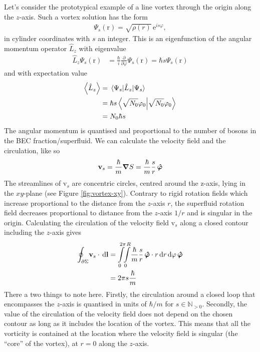 \documentclass[11pt,a4paper,twoside]{article}
\renewcommand{\vec}[1]{\bm{\mathrm{#1}}}
\newcommand{\unit}[1]{\,\mathrm{#1}}
\begin{document}
			Let's consider the prototypical example of a line vortex through the origin along the $z$-axis. Such a vortex solution has the form
			\begin{align}
				\Psi_s(\vec{r}) = \sqrt{\rho(r)}\unit{e}^{is\varphi},
			\end{align}
			in cylinder coordinates with $s$ an integer. This is an eigenfunction of the angular momentum operator $\hat{L}_z$ with eigenvalue
			\begin{align}
				\hat{L}_z \Psi_s(\vec{r}) &= \frac{\hbar}{i}\frac{\partial}{\partial\varphi}\Psi_s(\vec{r}) = \hbar s\Psi_s(\vec{r})
			\end{align}
			and with expectation value
			\begin{align}
				\expval{\hat{L}_z} &= \expval{\hat{L}_z}{\Psi_s} \\
					&= \hbar s \braket{\sqrt{N_0}\varphi_0} \\
					&= N_0\hbar s
			\end{align}
			The angular momentum is quantised and proportional to the number of bosons in the BEC fraction/superfluid. We can calculate the velocity field and the circulation, like so
			\begin{align}
				\vec{v}_s = \frac{\hbar}{m}\grad{S} = \frac{\hbar}{m}\frac{s}{r}\,\vu*{\varphi}
			\end{align}
			The streamlines of $\vec{v}_s$ are concentric circles, centred around the z-axis, lying in the $xy$-plane (see Figure \ref{fig:vortex-xy}). Contrary to rigid rotation fields which increase proportional to the distance from the $z$-axis $r$, the superfluid rotation field decreases proportional to distance from the $z$-axis $1/r$ and is singular in the origin. Calculating the circulation of the velocity field $\vec{v}_s$ along a closed contour including the $z$-axis gives
			\begin{align}
				\oint_{\partial\Sigma}\!\vec{v}_s\cdot\unit{d}\vec{l} &=
				\int\displaylimits_{0}^{2\pi}\!\!\int\displaylimits_{0}^{R}\!\frac{\hbar}{m}\frac{s}{r}\,\vu*{\varphi}\cdot r\unit{d}r\unit{d}\varphi\,\vu*{\varphi} \\
					&= 2\pi s\frac{\hbar}{m}
			\end{align}
			There a two things to note here. Firstly, the circulation around a closed loop that encompasses the $z$-axis is quantised in units of $\hbar/m$ for $s\in\mathbb{N}_{>0}$. Secondly, the value of the circulation of the velocity field does not depend on the chosen contour as long as it includes the location of the vortex. This means that all the vorticity is contained at the location where the velocity field is singular (the ``core'' of the vortex), at $r=0$ along the $z$-axis.\\
			
\end{document}
